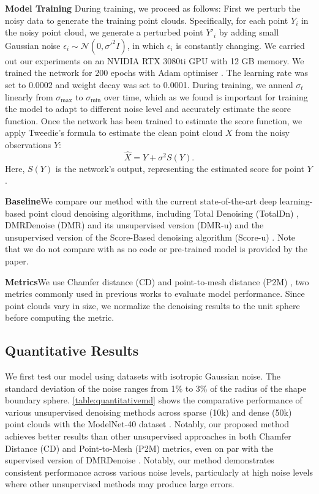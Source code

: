\noindent\textbf{Model Training}\quad 
During training, we proceed as follows:
First we perturb the noisy data to generate the training point clouds. Specifically, for each point $Y_i$ in the noisy point cloud, we generate a perturbed point $Y'_i$ by adding small Gaussian noise $\epsilon_i \sim \mathcal{N}(0, \sigma'^2 I)$, in which $\epsilon_i$ is constantly changing. We carried out our experiments on an NVIDIA RTX 3080ti GPU with 12 GB memory. We trained the network for 200 epochs with Adam optimiser \cite{kingma2014adam}. The learning rate was set to 0.0002 and weight decay was set to 0.0001. During training, we anneal $\sigma_t$ linearly from $\sigma_{\text{max}}$ to $\sigma_{\text{min}}$ over time, which as we found is important for training the model to adapt to different noise level and accurately estimate the score function. Once the network has been trained to estimate the score function, we apply Tweedie's formula to estimate the clean point cloud $X$ from the noisy observations $Y$:
\begin{equation} 
\hat{X} = Y + \sigma^2 S(Y).
\end{equation}
Here, $S(Y)$ is the network's output, representing the estimated score for point $Y$.

\noindent\textbf{Baseline}\quad We compare our method with the current state-of-the-art deep learning-based point cloud denoising algorithms, including Total Denoising (TotalDn) \cite{hermosilla2019TotalDenoising}, DMRDenoise (DMR) and its unsupervised version (DMR-u) \cite{luo2020DMR} and the unsupervised version of the Score-Based denoising algorithm (Score-u) \cite{luo_score-based_2021}. Note that we do not compare with \cite{noise4Wang2024} as no code or pre-trained model is provided by the paper. 

\noindent\textbf{Metrics}\quad We use Chamfer distance (CD) \cite{cdloss} and point-to-mesh distance (P2M) \cite{ravi2020pytorch3d}, two metrics commonly used in previous works to  evaluate model performance. Since point clouds vary in size, we normalize the denoising results to the unit sphere before computing the metric.


\subsection{Quantitative Results}
\label{sec:experiment:quantitative}
We first test our model using datasets with isotropic Gaussian noise. The standard deviation of the noise ranges from 1\% to 3\% of the radius of the shape boundary sphere.  \cref{table:quantitativemd} shows the comparative performance of various unsupervised denoising methods across sparse (10k) and dense (50k) point clouds with the ModelNet-40 dataset \cite{wu2015modelnet}. Notably, our proposed method achieves better results than other unsupervised approaches in both Chamfer Distance (CD) and Point-to-Mesh (P2M) metrics, even on par with the supervised version of DMRDenoise \cite{luo2020DMR}. Notably, our method demonstrates consistent performance across various noise levels, particularly at high noise levels where other unsupervised methods may produce large errors. 

